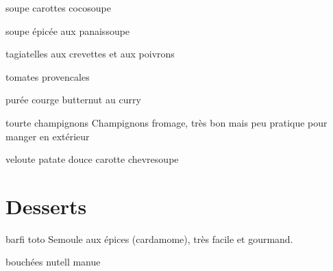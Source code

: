 	\begin{recette}{soupe carottes coco}{soupe}
	\end{recette}
	
	\begin{recette}{soupe épicée aux panais}{soupe}
	\end{recette}
	
	\begin{recette}{tagiatelles aux crevettes et aux poivrons}{}
	\end{recette}
	
	\begin{recette}{tomates provencales}{}
	\end{recette}
	
	\begin{recette}{purée courge butternut au curry}{}
	\end{recette}
	
	\begin{recette}{\heart tourte champignons}{}
		Champignons fromage, très bon mais peu pratique pour manger en extérieur 
	\end{recette}
	
	\begin{recette}{veloute patate douce carotte chevre}{soupe}
	\end{recette}
	
	
	\newpage
	\vfill
	\section{Desserts}
	\vfill
	\newpage
	\begin{recette}{\heart barfi toto}{}
		Semoule aux épices (cardamome), très facile et gourmand.
	\end{recette}
	
	\begin{recette}{\heart bouchées nutell manue}{}
	\end{recette}
	
